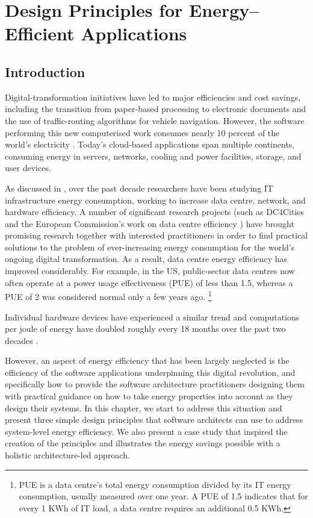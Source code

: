 \chapter{Design Principles for Energy--Efficient Applications}
\label{chapter:energydesignprinciples}

\section{Introduction}

Digital-transformation initiatives have led to major efficiencies and cost savings, including the transition from paper-based processing to electronic documents and the use of traffic-routing algorithms for vehicle navigation. However, the software performing this new computerised work consumes nearly 10 percent of the world's electricity \cite{mills2013-digital-energyusage}. Today's cloud-based applications span multiple continents, consuming energy in servers, networks, cooling and power facilities, storage, and user devices.

As discussed in , over the past decade researchers have been studying IT infrastructure energy consumption, working to increase data centre, network, and hardware efficiency. A number of significant research projects (such as DC4Cities \cite{dc4cities2014_dcmetrics} and the European Commission's work on data centre efficiency \cite{eu2018-datacentreenergy}) have brought promising research together with interested practitioners in order to find practical solutions to the problem of ever-increasing energy consumption for the world's ongoing digital transformation.  As a result, data centre energy efficiency has improved considerably. For example, in the US, public-sector data centres now often operate at a power usage effectiveness (PUE) of less than 1.5, whereas a PUE of 2 was considered normal only a few years ago. \footnote{PUE is a data centre's total energy consumption divided by its IT energy consumption, usually measured over one year. A PUE of 1.5 indicates that for every 1 KWh of IT load, a data centre requires an additional 0.5 KWh.}

Individual hardware devices have experienced a similar trend and computations per joule of energy have doubled roughly every 18 months over the past two decades \cite{koomey2011-trends-energy-efficiency}. 

However, an aspect of energy efficiency that has been largely neglected is the efficiency of the software applications underpinning this digital revolution, and specifically how to provide the software architecture practitioners designing them with practical guidance on how to take energy properties into account as they design their systems.  In this chapter, we start to address this situation and present three simple design principles that software architects can use to address system-level energy efficiency. We also present a case study that inspired the creation of the principles and illustrates the energy savings possible with a holistic architecture-led approach.

